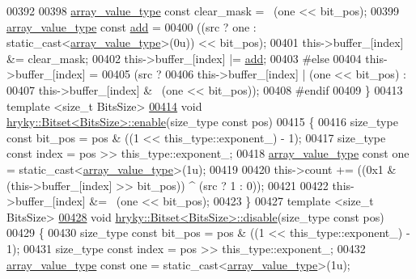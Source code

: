 \begin{DoxyCode}
00392 \textcolor{preprocessor}{}
00398     \hyperlink{classhryky_1_1_unsigned_enough_exponent}{array_value_type} \textcolor{keyword}{const} clear\_mask = ~(one << bit\_pos);
00399     \hyperlink{classhryky_1_1_unsigned_enough_exponent}{array_value_type} \textcolor{keyword}{const} \hyperlink{namespacehryky_1_1scale_ac2fe4df99c737fa954907b456a705f75}{add} =
00400         ((src ? one : \textcolor{keyword}{static\_cast<}\hyperlink{classhryky_1_1_unsigned_enough_exponent}{array_value_type}\textcolor{keyword}{>}(0u)) << bit\_pos);
00401     this->buffer\_[index] &= clear\_mask;
00402     this->buffer\_[index] |= \hyperlink{namespacehryky_1_1scale_ac2fe4df99c737fa954907b456a705f75}{add};
00403 \textcolor{preprocessor}{#else}
00404 \textcolor{preprocessor}{}    this->buffer\_[index] =
00405         (src ?
00406          this->buffer\_[index] | (one << bit\_pos) :
00407          this->buffer\_[index] & ~(one << bit\_pos));
00408 \textcolor{preprocessor}{#endif}
00409 \textcolor{preprocessor}{}\}
00413 \textcolor{keyword}{template} <\textcolor{keywordtype}{size\_t} BitsSize>
\hypertarget{bitset_8h_source_l00414}{}\hyperlink{classhryky_1_1_bitset_a1db71e8b84836648e8e4261c20a9a1bc}{00414} \textcolor{keywordtype}{void} \hyperlink{classhryky_1_1_bitset}{hryky::Bitset<BitsSize>::enable}(size\_type \textcolor{keyword}{const} pos)
00415 \{
00416     size\_type \textcolor{keyword}{const} bit\_pos = pos & ((1 << this\_type::exponent\_) - 1);
00417     size\_type \textcolor{keyword}{const} index = pos >> this\_type::exponent\_;
00418     \hyperlink{classhryky_1_1_unsigned_enough_exponent}{array_value_type} \textcolor{keyword}{const} one = \textcolor{keyword}{static\_cast<}\hyperlink{classhryky_1_1_unsigned_enough_exponent}{array_value_type}\textcolor{keyword}{>}(1u);
00419 
00420     this->count += ((0x1 & (this->buffer\_[index] >> bit\_pos)) ^ (src ? 1 : 0));
00421 
00422     this->buffer\_[index] &= ~(one << bit\_pos);
00423 \}
00427 \textcolor{keyword}{template} <\textcolor{keywordtype}{size\_t} BitsSize>
\hypertarget{bitset_8h_source_l00428}{}\hyperlink{classhryky_1_1_bitset_ae4da085a5c1780906a9df5252b86624b}{00428} \textcolor{keywordtype}{void} \hyperlink{classhryky_1_1_bitset}{hryky::Bitset<BitsSize>::disable}(size\_type \textcolor{keyword}{const} pos)
00429 \{
00430     size\_type \textcolor{keyword}{const} bit\_pos = pos & ((1 << this\_type::exponent\_) - 1);
00431     size\_type \textcolor{keyword}{const} index = pos >> this\_type::exponent\_;
00432     \hyperlink{classhryky_1_1_unsigned_enough_exponent}{array_value_type} \textcolor{keyword}{const} one = \textcolor{keyword}{static\_cast<}\hyperlink{classhryky_1_1_unsigned_enough_exponent}{array_value_type}\textcolor{keyword}{>}(1u);

\end{DoxyCode}

